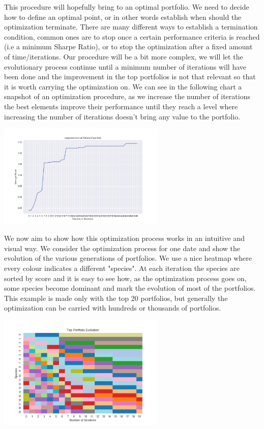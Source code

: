 This procedure will hopefully bring to an optimal portfolio. We need to decide how to define an optimal point, or in other words establish when should the optimization terminate. There are many different ways to establish a termination condition, common ones are to stop once a certain performance criteria is reached (i.e a minimum Sharpe Ratio), or to stop the optimization after a fixed amount of time/iterations. Our procedure will be a bit more complex, we will let the evolutionary process continue until a minimum number of iterations will have been done and the improvement in the top portfolios is not that relevant so that it is worth carrying the optimization on. We can see in the following chart a snapshot of an optimization procedure, as we increase the number of iterations the best elements improve their performance until they reach a level where increasing the number of iterations doesn't bring any value to the portfolio.\\

\begin{center}
	\centering
	\includegraphics[width=0.6\textwidth]{Genetic_Algo/Fitness_function.png}
	\label{Fitness_func}
\end{center}


We now aim to show how this optimization process works in an intuitive and visual way. We consider the optimization process for one date and show the evolution of the various generations of portfolios. We use a nice heatmap where every colour indicates a different "species". At each iteration the species are sorted by score and it is easy to see how, as the optimization process goes on, some species become dominant and mark the evolution of most of the portfolios. This example is made only with the top 20 portfolios, but generally the optimization can be carried with hundreds or thousands of portfolios.

\begin{center}
	\centering
	\includegraphics[width=0.6\textwidth]{Genetic_Algo/Evolution.png}
	\label{evolution}
\end{center}

